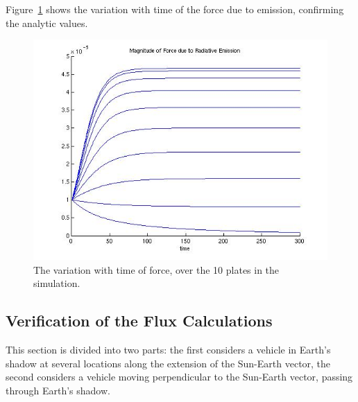 \begin{description}
    Figure~\ref{fig:ivv_F_emission_10plate} shows the variation with
    time of the force due to emission, confirming the analytic
    values.
    \begin{figure}[!ht]
        \includegraphics[width=180mm]{figs/Fe_int/force_emission10plate.jpg}
        \caption{The variation with time of force, over the 10 plates in
        the simulation.}
        \label{fig:ivv_F_emission_10plate}
      \end{figure}
  \clearpage
  \end{description}
\clearpage

\subsection{Verification of the Flux Calculations}\label{sec:verifflux}

This section is divided into two parts:  the first considers a
vehicle in Earth's shadow at several locations along the extension
of the Sun-Earth
vector, the second considers a vehicle moving perpendicular to the
Sun-Earth vector, passing through Earth's shadow.

